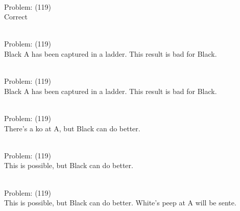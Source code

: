 \documentclass[11pt]{article}
\begin{document}
\begin{minipage}[t]{0.5\textwidth}
  {\centering
  
\\
Problem: (119)\\
Correct\\
  }
\end{minipage}
\begin{minipage}[t]{0.5\textwidth}
  {\centering
  
\\
Problem: (119)\\
Black A has been captured in a ladder. This result is bad for Black.\\
  }
\end{minipage}
\begin{minipage}[t]{0.5\textwidth}
  {\centering
  
\\
Problem: (119)\\
Black A has been captured in a ladder. This result is bad for Black.\\
  }
\end{minipage}
\begin{minipage}[t]{0.5\textwidth}
  {\centering
  
\\
Problem: (119)\\
There's a ko at A, but Black can do better.\\
  }
\end{minipage}
\begin{minipage}[t]{0.5\textwidth}
  {\centering
  
\\
Problem: (119)\\
This is possible, but Black can do better.\\
  }
\end{minipage}
\begin{minipage}[t]{0.5\textwidth}
  {\centering
  
\\
Problem: (119)\\
This is possible, but Black can do better. White's peep at A will be sente.\\
  }
\end{minipage}
\end{document}
